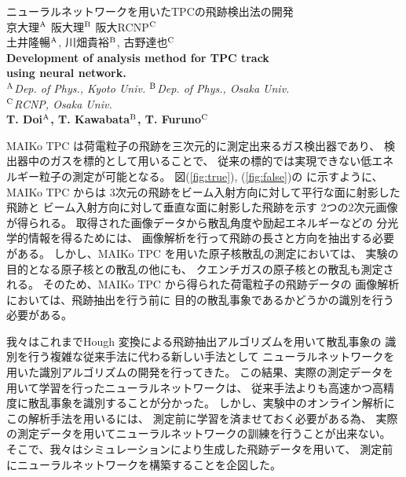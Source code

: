 \documentclass[12pt,a4paper]{jsarticle}
\begin{document}
\vspace{-5pt}
\begin{center}
  {\gt \Large ニューラルネットワークを用いたTPCの飛跡検出法の開発 }\\[14pt]
  
  {\gt \large 京大理$^{\rm{A}}$ 阪大理$^{\rm{B}}$ 阪大RCNP$^{\rm{C}}$\\
    土井隆暢$^{\rm{A}}$, 川畑貴裕$^{\rm{B}}$, 古野達也$^{\rm{C}}$}\\[5pt]
  
  {\large \bf Development of analysis method for TPC track \\
    using neural network.}\\[5pt]
  
  {\large \it $^{\rm{A}}$Dep. of Phys., Kyoto Univ. $^{\rm{B}}$Dep. of Phys., Osaka Univ. \\
    $^{\rm{C}}$RCNP, Osaka Univ.}\\
  
  {\large \bf T. Doi$^{\rm{A}}$, T. Kawabata$^{\rm{B}}$, T. Furuno$^{\rm{C}}$}
\end{center}

\vspace{5pt}
\small
MAIKo TPC%
は荷電粒子の飛跡を三次元的に測定出来るガス検出器であり、
検出器中のガスを標的として用いることで、
従来の標的では実現できない低エネルギー粒子の測定が可能となる。
図(\ref{fig:true}), (\ref{fig:false})の%
に示すように、MAIKo TPC からは
3次元の飛跡をビーム入射方向に対して平行な面に射影した飛跡と
ビーム入射方向に対して垂直な面に射影した飛跡を示す
2つの2次元画像が得られる。
取得された画像データから散乱角度や励起エネルギーなどの
分光学的情報を得るためには、
画像解析を行って飛跡の長さと方向を抽出する必要がある。
しかし、MAIKo TPC を用いた原子核散乱の測定においては、
実験の目的となる原子核との散乱の他にも、
クエンチガスの原子核との散乱も測定される。
そのため、MAIKo TPC から得られた荷電粒子の飛跡データの
画像解析においては、飛跡抽出を行う前に
目的の散乱事象であるかどうかの識別を行う必要がある。

我々はこれまでHough 変換による飛跡抽出アルゴリズムを用いて散乱事象の
識別を行う複雑な従来手法に代わる新しい手法として
ニューラルネットワークを用いた識別アルゴリズムの開発を行ってきた。
この結果、実際の測定データを用いて学習を行ったニューラルネットワークは、
従来手法よりも高速かつ高精度に散乱事象を識別することが分かった。
しかし、実験中のオンライン解析にこの解析手法を用いるには、
測定前に学習を済ませておく必要がある為、
実際の測定データを用いてニューラルネットワークの訓練を行うことが出来ない。
そこで、我々はシミュレーションにより生成した飛跡データを用いて、
測定前にニューラルネットワークを構築することを企図した。
\end{document}
